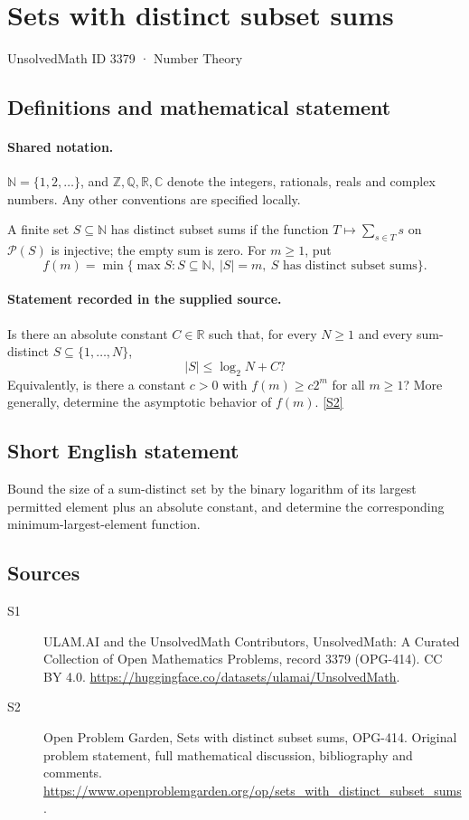 \documentclass[11pt]{article}
\newcommand{\sref}[2]{\hyperlink{source:#1:#2}{[S#2]}}
\begin{document}
\setcounter{section}{3378}
\section{Sets with distinct subset sums}\label{3379}
{\small\sffamily UnsolvedMath ID 3379 · Number Theory}
\subsection{Definitions and mathematical statement}

\paragraph{Shared notation.}$\mathbb N=\{1,2,\ldots\}$, and $\mathbb Z,\mathbb Q,\mathbb R,\mathbb C$ denote the integers, rationals, reals and complex numbers. Any other conventions are specified locally.


A finite set $S\subseteq\mathbb N$ has distinct subset sums if the function $T\mapsto\sum_{s\in T}s$ on $\mathcal P(S)$ is injective; the empty sum is zero. For $m\ge1$, put
\[
 f(m)=\min\{\max S:S\subseteq\mathbb N,\ |S|=m,\ S\text{ has distinct subset sums}\}.
\]
\paragraph{Statement recorded in the supplied source.}
Is there an absolute constant $C\in\mathbb R$ such that, for every $N\ge1$ and every sum-distinct $S\subseteq\{1,\ldots,N\}$,
\[
 |S|\le\log_2 N+C?
\]
Equivalently, is there a constant $c>0$ with $f(m)\ge c2^m$ for all $m\ge1$? More generally, determine the asymptotic behavior of $f(m)$. \sref{3379}{2}
\subsection{Short English statement}
Bound the size of a sum-distinct set by the binary logarithm of its largest permitted element plus an absolute constant, and determine the corresponding minimum-largest-element function.
\subsection{Sources}
\begin{description}
\item[\hypertarget{source:3379:1}{S1}] ULAM.AI and the UnsolvedMath Contributors, UnsolvedMath: A Curated Collection of Open Mathematics Problems, record 3379 (OPG-414). CC BY 4.0. \url{https://huggingface.co/datasets/ulamai/UnsolvedMath}.
\item[\hypertarget{source:3379:2}{S2}] Open Problem Garden, Sets with distinct subset sums, OPG-414. Original problem statement, full mathematical discussion, bibliography and comments. \url{https://www.openproblemgarden.org/op/sets_with_distinct_subset_sums}.
\end{description}
\label{end:3379}
\end{document}
